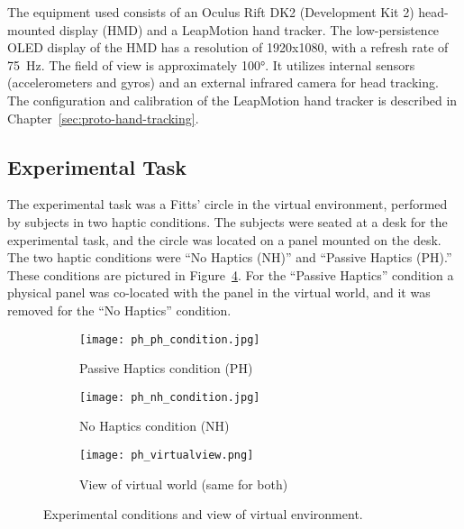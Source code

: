 The equipment used consists of an Oculus Rift DK2 (Development Kit 2) head-mounted display (HMD) and a LeapMotion hand tracker.
The low-persistence OLED display of the HMD has a resolution of 1920x1080, with a refresh rate of \SI{75}{\hertz}.
The field of view is approximately \ang{100}.
It utilizes internal sensors (accelerometers and gyros) and an external infrared camera for head tracking.
The configuration and calibration of the LeapMotion hand tracker is described in Chapter~\ref{sec:proto-hand-tracking}.

\subsection{Experimental Task}

The experimental task was a Fitts' circle in the virtual environment, performed by subjects in two haptic conditions.
The subjects were seated at a desk for the experimental task, and the circle was located on a panel mounted on the desk.
The two haptic conditions were ``No Haptics (NH)'' and ``Passive Haptics (PH).''
These conditions are pictured in Figure~\ref{fig:ph_conditions}.
For the ``Passive Haptics'' condition a physical panel was co-located with the panel in the virtual world, and it was removed for the ``No Haptics'' condition.

\mbox{}\hfill
\begin{figure}
    \centering
    \begin{subfigure}[t]{0.3\linewidth}
        \centering
        \texttt{[image: ph\_ph\_condition.jpg]}
        \caption{Passive Haptics condition (PH)}
        \label{fig:ph_conditions:ph_condition}
    \end{subfigure}\hfill
    \begin{subfigure}[t]{0.3\linewidth}
        \centering
        \texttt{[image: ph\_nh\_condition.jpg]}
        \caption{No Haptics condition (NH)}
        \label{fig:ph_conditions:nh_condition}
    \end{subfigure}\hfill
    \begin{subfigure}[t]{0.3\linewidth}
        \centering
        \texttt{[image: ph\_virtualview.png]}
        \caption{View of virtual world (same for both)}
        \label{fig:ph_conditions:virtual}
    \end{subfigure}
    \caption{Experimental conditions and view of virtual environment.}
    \label{fig:ph_conditions}
\end{figure}
\hfill\mbox{}

